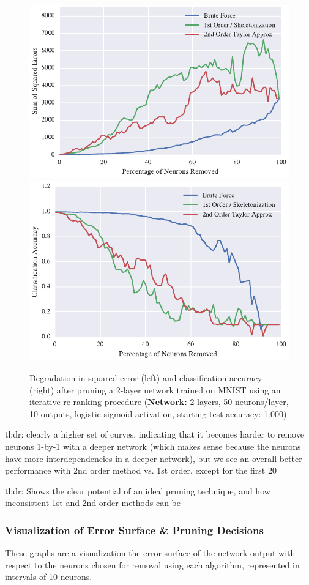 \begin{figure}[!hb]
\centering
\includegraphics[width=0.49\linewidth]{png/mnist-deep-iterative-rerank-method.pdf}
\includegraphics[width=0.49\linewidth]{png/mnist-deep-iterative-rerank-accuracy.pdf}
\caption{Degradation in squared error (left) and classification accuracy (right) after pruning a 2-layer network trained on MNIST using an iterative re-ranking procedure (\textbf{Network:} 2 layers, 50 neurons/layer, 10 outputs, logistic sigmoid activation, starting test accuracy: 1.000)}
\label{fig:mnist-re-ranking-double-layer}
\end{figure}

tl;dr: clearly a higher set of curves, indicating that it becomes harder to remove neurons 1-by-1 with a deeper network (which makes sense because the neurons have more interdependencies in a deeper network), but we see an overall better performance with 2nd order method vs. 1st order, except for the first 20%

tl;dr: Shows the clear potential of an ideal pruning technique, and how inconsistent 1st and 2nd order methods can be

\subsubsection{Visualization of Error Surface \& Pruning Decisions}
These graphs are a visualization the error surface of the network output with respect to the neurons chosen for removal using each algorithm, represented in intervals of 10 neurons. 

